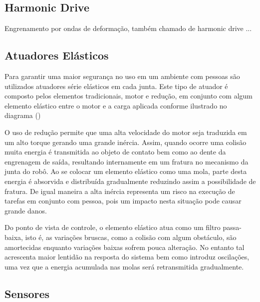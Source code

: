 \subsection{Harmonic Drive}

Engrenamento por ondas de deformação, também chamado de harmonic drive ... 




\subsection{Atuadores Elásticos}

Para garantir uma maior segurança no uso em um ambiente com pessoas são utilizados atuadores série elásticos em cada junta. Este tipo de atuador é composto pelos elementos tradicionais, motor e redução, em conjunto com algum elemento elástico entre o motor e a carga aplicada conforme ilustrado no diagrama ()


O uso de redução permite que uma alta velocidade do motor seja traduzida em um alto torque gerando uma grande inércia. Assim, quando ocorre uma colisão muita energia é transmitida ao objeto de contato bem como ao dente da engrenagem de saída, resultando internamente em um fratura no mecanismo da junta do robô. Ao se colocar um elemento elástico como uma mola, parte desta energia é absorvida e distribuída gradualmente reduzindo assim a possibilidade de fratura. De igual maneira a alta inércia representa um risco na execução de tarefas em conjunto com pessoa, pois um impacto nesta situação pode causar grande danos.

Do ponto de vista de controle, o elemento elástico atua como um filtro passa-baixa, isto é, as variações bruscas, como a colisão com algum obstáculo, são amortecidas enquanto variações baixas sofrem pouca alteração. No entanto tal acrescenta maior lentidão na resposta do sistema bem como introduz oscilações, uma vez que a energia acumulada nas molas será retransmitida gradualmente.


\subsection{Sensores}

